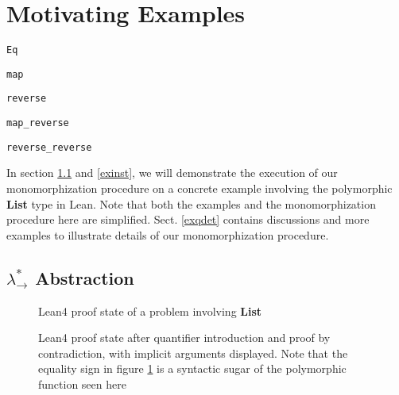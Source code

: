 \section{Motivating Examples} \label{motex}

\begin{lrbox}{\vEq} {\color{hypcolor} \verb|Eq|} \end{lrbox}
\begin{lrbox}{\vmap} {\color{hypcolor} \verb|map|} \end{lrbox}
\begin{lrbox}{\vrev} {\color{hypcolor} \verb|reverse|} \end{lrbox}
\begin{lrbox}{\vmaprev} {\color{hypcolor} \verb|map_reverse|} \end{lrbox}
\begin{lrbox}{\vrevrev} {\color{hypcolor} \verb|reverse_reverse|} \end{lrbox}

In section \ref{exabst} and \ref{exinst}, we will demonstrate the execution of our monomorphization procedure on a
concrete example involving the polymorphic \textbf{List} type in Lean. Note that both
the examples and the monomorphization procedure here are simplified. Sect. \ref{exqdet} contains
discussions and more examples to illustrate details of our monomorphization procedure.

\subsection{$\lambda_\to^*$ Abstraction} \label{exabst}

\begin{figure}
  \begin{CenteredBox}
    
  \end{CenteredBox}
  \caption{Lean4 proof state of a problem involving \textbf{List}} \label{leanlistpretty}
\end{figure}

\begin{figure}
  \begin{CenteredBox}
    
  \end{CenteredBox}
  \caption{Lean4 proof state after quantifier introduction and proof by contradiction, with implicit arguments displayed.
    Note that the equality sign in figure \ref{leanlistpretty} is a syntactic sugar of
    the polymorphic function {\usebox{\vEq}} seen here}
  \label{leanlistexplicit}
\end{figure}

